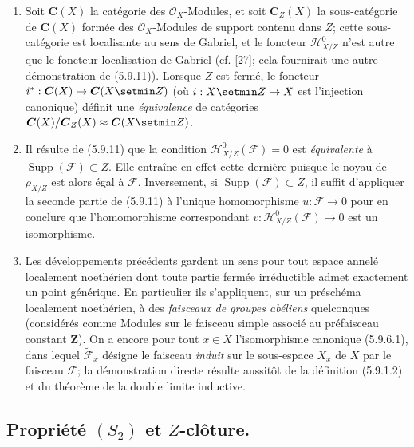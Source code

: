 \begin{remarks}[5.9.12]
\label{IV.2.s5.9.12-fr}
\begin{enumerate}
\item[(i)] Soit $\boldsymbol{C}(X)$ la catégorie des $\mathcal O_X$-Modules, et
soit $\boldsymbol{C}_Z(X)$ la sous-catégorie de $\boldsymbol{C}(X)$ formée des
$\mathcal O_X$-Modules de support contenu dans $Z$; cette sous-catégorie est
localisante au sens de Gabriel, et le foncteur $\mathcal H^0_{X/Z}$ n'est
autre que le foncteur localisation de Gabriel (cf. [27]; cela fournirait une
autre démonstration de (5.9.11)). Lorsque $Z$ est fermé, le foncteur
$i^*:\boldsymbol{C}(X)\to\boldsymbol{C}(X\setmin Z)$ (où $i:X\setmin Z\to X$ est l'injection
canonique) définit une \emph{équivalence} de catégories
$\boldsymbol{C}(X)/\boldsymbol{C}_Z(X)\approx\boldsymbol{C}(X\setmin Z)$.
\item[(ii)] Il résulte de (5.9.11) que la condition
$\mathcal H^0_{X/Z}(\mathcal F)=0$ est \emph{équivalente} à
$\operatorname{Supp}(\mathcal F)\subset Z$. Elle entraîne en effet cette
dernière puisque le noyau de $\rho_{X/Z}$ est alors égal à $\mathcal F$.
Inversement, si $\operatorname{Supp}(\mathcal F)\subset Z$, il suffit
d'appliquer la seconde partie de (5.9.11) à l'unique homomorphisme
$u:\mathcal F\to0$ pour en conclure que l'homomorphisme correspondant
$v:\mathcal H^0_{X/Z}(\mathcal F)\to0$ est un isomorphisme.
\item[(iii)] Les développements précédents gardent un sens pour tout espace
annelé localement noethérien dont toute partie fermée irréductible admet
exactement un point générique. En particulier ils s'appliquent, sur un
préschéma localement noethérien, à des \emph{faisceaux de groupes abéliens}
quelconques (considérés comme Modules sur le faisceau simple associé au
préfaisceau constant $\mathbf Z$). On a encore pour tout $x\in X$
l'isomorphisme canonique (5.9.6.1), dans lequel
$\widetilde{\mathcal F}_x$ désigne le faisceau \emph{induit} sur le sous-espace
$X_x$ de $X$ par le faisceau $\mathcal F$; la démonstration directe résulte
aussitôt de la définition (5.9.1.2) et du théorème de la double limite
inductive.
\end{enumerate}
\end{remarks}

\subsection{\texorpdfstring{Propriété $(S_2)$ et $Z$-clôture.}{Propriété (S\string_2) et Z-clôture}}

